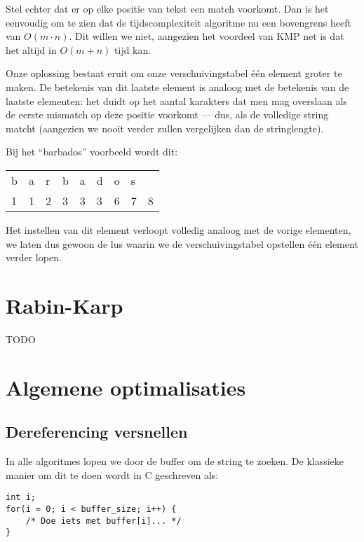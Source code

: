 \documentclass[a4paper,11pt]{article}
\begin{document}
Stel echter dat er op elke positie van tekst een match voorkomt. Dan is het
eenvoudig om te zien dat de tijdscomplexiteit algoritme nu een bovengrens heeft
van $O(m \cdot n)$. Dit willen we niet, aangezien het voordeel van KMP net is
dat het altijd in $O(m + n)$ tijd kan.

Onze oplossing bestaat eruit om onze verschuivingstabel \'e\'en element groter
te maken. De betekenis van dit laatste element is analoog met de betekenis van
de laatste elementen: het duidt op het aantal karakters dat men mag overslaan
als de eerste mismatch op deze positie voorkomt — dus, als de volledige string
matcht (aangezien we nooit verder zullen vergelijken dan de stringlengte).

Bij het “barbados” voorbeeld wordt dit:

\begin{center}
\begin{tabular}{lllllllll}
b & a & r & b & a & d & o & s &   \\
1 & 1 & 2 & 3 & 3 & 3 & 6 & 7 & 8 \\
\end{tabular}
\end{center}

Het instellen van dit element verloopt volledig analoog met de vorige elementen,
we laten dus gewoon de lus waarin we de verschuivingstabel opstellen \'e\'en
element verder lopen.

\section{Rabin-Karp}

TODO

\section{Algemene optimalisaties}

\subsection{Dereferencing versnellen}

In alle algoritmes lopen we door de buffer om de string te zoeken. De klassieke
manier om dit te doen wordt in C geschreven als:

\begin{verbatim}
int i;
for(i = 0; i < buffer_size; i++) {
    /* Doe iets met buffer[i]... */
}
\end{verbatim}
\end{document}
